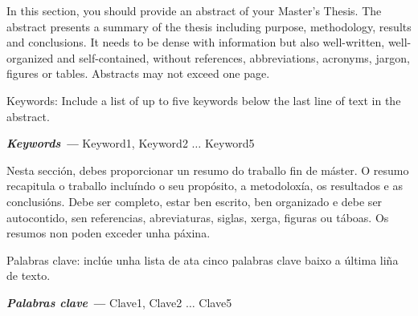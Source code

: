 \label{sec:abstract}

In this section, you should provide an abstract of your Master's Thesis.  The abstract presents a summary of the thesis including purpose, methodology, results and conclusions. It needs to be dense with information but also well-written, well-organized and self-contained, without references, abbreviations, acronyms, jargon, figures or tables. Abstracts may not exceed one page.

Keywords: Include a list of up to five keywords below the last line of text in the abstract. 

{\vspace{5mm}\textbf{\textit{Keywords ---}} Keyword1, Keyword2 $\ldots$ Keyword5} 


\label{sec:resumo}
Nesta sección, debes proporcionar un resumo do traballo fin de máster. O resumo recapitula o traballo incluíndo o seu propósito, a metodoloxía, os resultados e as conclusións. Debe ser completo, estar ben escrito, ben organizado e debe ser autocontido, sen referencias, abreviaturas, siglas, xerga, figuras ou táboas. Os resumos non poden exceder unha páxina.

Palabras clave: inclúe unha lista de ata cinco palabras clave baixo a última liña de texto.


{\vspace{5mm}\textbf{\textit{Palabras clave ---}} Clave1, Clave2 $\ldots$ Clave5} 
